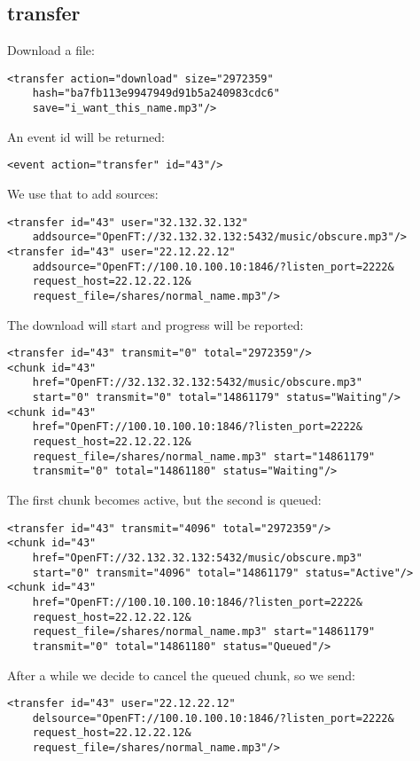\documentclass[10pt]{article}
\begin{document}
\subsection{transfer}

Download a file:
\begin{verbatim}
<transfer action="download" size="2972359"
    hash="ba7fb113e9947949d91b5a240983cdc6"
    save="i_want_this_name.mp3"/>
\end{verbatim}

An event id will be returned:
\begin{verbatim}
<event action="transfer" id="43"/>
\end{verbatim}

We use that to add sources:
\begin{verbatim}
<transfer id="43" user="32.132.32.132"
    addsource="OpenFT://32.132.32.132:5432/music/obscure.mp3"/>
<transfer id="43" user="22.12.22.12"
    addsource="OpenFT://100.10.100.10:1846/?listen_port=2222&
    request_host=22.12.22.12&
    request_file=/shares/normal_name.mp3"/>
\end{verbatim}

The download will start and progress will be reported:
\begin{verbatim}
<transfer id="43" transmit="0" total="2972359"/>
<chunk id="43"
    href="OpenFT://32.132.32.132:5432/music/obscure.mp3"
    start="0" transmit="0" total="14861179" status="Waiting"/>
<chunk id="43"
    href="OpenFT://100.10.100.10:1846/?listen_port=2222&
    request_host=22.12.22.12&
    request_file=/shares/normal_name.mp3" start="14861179"
    transmit="0" total="14861180" status="Waiting"/>
\end{verbatim}

The first chunk becomes active, but the second is queued:
\begin{verbatim}
<transfer id="43" transmit="4096" total="2972359"/>
<chunk id="43"
    href="OpenFT://32.132.32.132:5432/music/obscure.mp3"
    start="0" transmit="4096" total="14861179" status="Active"/>
<chunk id="43"
    href="OpenFT://100.10.100.10:1846/?listen_port=2222&
    request_host=22.12.22.12&
    request_file=/shares/normal_name.mp3" start="14861179"
    transmit="0" total="14861180" status="Queued"/>
\end{verbatim}

After a while we decide to cancel the queued chunk, so we send:
\begin{verbatim}
<transfer id="43" user="22.12.22.12"
    delsource="OpenFT://100.10.100.10:1846/?listen_port=2222&
    request_host=22.12.22.12&
    request_file=/shares/normal_name.mp3"/>
\end{verbatim}
\end{document}
